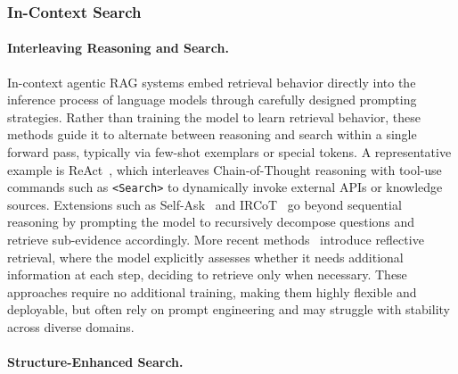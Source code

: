 


\subsubsection{In-Context Search}

\paragraph{Interleaving Reasoning and Search.}

In-context agentic RAG systems embed retrieval behavior directly into the inference process of language models through carefully designed prompting strategies. Rather than training the model to learn retrieval behavior, these methods guide it to alternate between reasoning and search within a single forward pass, typically via few-shot exemplars or special tokens. A representative example is ReAct~\cite{yao2023react}, which interleaves Chain-of-Thought reasoning with tool-use commands such as \texttt{<Search>} to dynamically invoke external APIs or knowledge sources. Extensions such as Self-Ask~\cite{press2022measuring} and IRCoT~\cite{trivedi2022interleaving} go beyond sequential reasoning by prompting the model to recursively decompose questions and retrieve sub-evidence accordingly. More recent methods~\cite{asai2023self, li2024benchmarking, guan2025deeprag, ning2025mc} introduce reflective retrieval, where the model explicitly assesses whether it needs additional information at each step, deciding to retrieve only when necessary. These approaches require no additional training, making them highly flexible and deployable, but often rely on prompt engineering and may struggle with stability across diverse domains.

\paragraph{Structure-Enhanced Search.}

